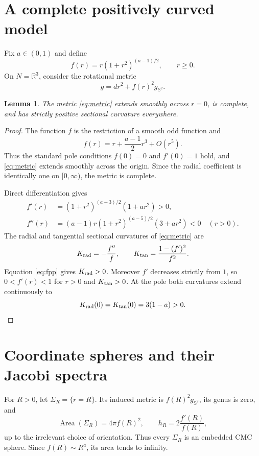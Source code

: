\documentclass[11pt]{article}
\newtheorem{lemma}[theorem]{Lemma}
\theoremstyle{remark}
\newcommand{\Area}{\operatorname{Area}}
\begin{document}
\section{A complete positively curved model}

Fix $a\in(0,1)$ and define
\begin{equation}\label{eq:warping}
 f(r)=r(1+r^2)^{(a-1)/2},\qquad r\ge0.
\end{equation}
On $N=\mathbb R^3$, consider the rotational metric
\begin{equation}\label{eq:metric}
 g=dr^2+f(r)^2g_{\mathbb S^2}.
\end{equation}

\begin{lemma}\label{lem:geometry}
The metric \eqref{eq:metric} extends smoothly across $r=0$, is complete,
and has strictly positive sectional curvature everywhere.
\end{lemma}

\begin{proof}
The function $f$ is the restriction of a smooth odd function and
\[
 f(r)=r+\frac{a-1}{2}r^3+O(r^5).
\]
Thus the standard pole conditions $f(0)=0$ and $f'(0)=1$ hold, and
\eqref{eq:metric} extends smoothly across the origin.  Since the radial
coefficient is identically one on $[0,\infty)$, the metric is complete.

Direct differentiation gives
\begin{align}
 f'(r)&=(1+r^2)^{(a-3)/2}(1+ar^2)>0,\label{eq:fp}\\
 f''(r)&=(a-1)r(1+r^2)^{(a-5)/2}(3+ar^2)<0
 \quad(r>0).\label{eq:fpp}
\end{align}
The radial and tangential sectional curvatures of \eqref{eq:metric} are
\[
 K_{\rm rad}=-\frac{f''}{f},
 \qquad
 K_{\rm tan}=\frac{1-(f')^2}{f^2}.
\]
Equation \eqref{eq:fpp} gives $K_{\rm rad}>0$.  Moreover $f'$ decreases
strictly from $1$, so $0<f'(r)<1$ for $r>0$ and $K_{\rm tan}>0$.
At the pole both curvatures extend continuously to
\[
 K_{\rm rad}(0)=K_{\rm tan}(0)=3(1-a)>0.
\]
\end{proof}

\section{Coordinate spheres and their Jacobi spectra}

For $R>0$, let $\Sigma_R=\{r=R\}$.  Its induced metric is
$f(R)^2g_{\mathbb S^2}$, its genus is zero, and
\begin{equation}\label{eq:area-h}
 \Area(\Sigma_R)=4\pi f(R)^2,
 \qquad
 h_R=2\frac{f'(R)}{f(R)},
\end{equation}
up to the irrelevant choice of orientation.  Thus every $\Sigma_R$ is an
embedded CMC sphere.  Since $f(R)\sim R^a$, its area tends to infinity.
\end{document}
